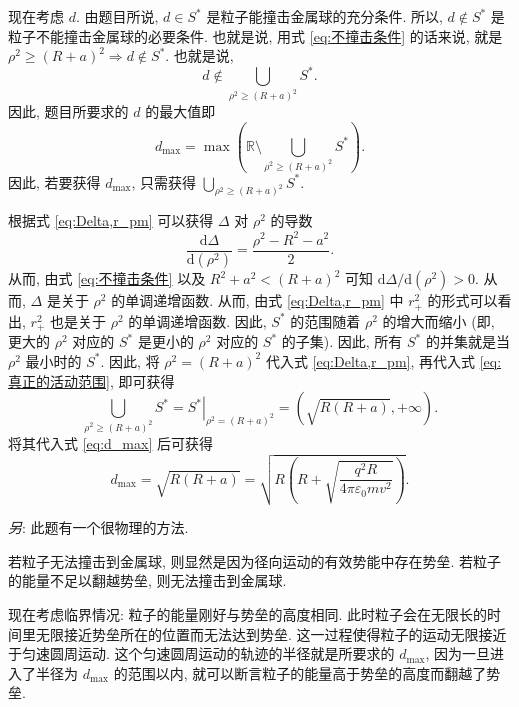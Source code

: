 \documentclass{article}
\begin{document}
现在考虑 $d$.
由题目所说, $d\in S^*$ 是粒子能撞击金属球的充分条件.
所以, $d\notin S^*$ 是粒子不能撞击金属球的必要条件.
也就是说, 用式 \ref{eq:不撞击条件} 的话来说, 就是
$\rho^2\ge\left(R+a\right)^2\Rightarrow d\notin S^*$.
也就是说,
\begin{equation}
	d\notin\bigcup_{\rho^2\ge\left(R+a\right)^2}S^*.
\end{equation}
因此, 题目所要求的 $d$ 的最大值即
\begin{equation}
	\label{eq:d_max}
	d_{\mathrm{max}}=\max\left(\mathbb R\setminus
	\bigcup_{\rho^2\ge\left(R+a\right)^2}S^*\right).
\end{equation}
因此, 若要获得 $d_{\mathrm{max}}$, 只需获得 $\bigcup_{\rho^2\ge\left(R+a\right)^2}S^*$.

根据式 \ref{eq:Delta,r_pm} 可以获得 $\Delta$ 对 $\rho^2$ 的导数
\begin{equation}
	\frac{\mathrm d\Delta}{\mathrm d\!\left(\rho^2\right)}=\frac{\rho^2-R^2-a^2}2.
\end{equation}
从而, 由式 \ref{eq:不撞击条件} 以及 $R^2+a^2<\left(R+a\right)^2$ 可知
$\mathrm d\Delta/\mathrm d\!\left(\rho^2\right)>0$.
从而, $\Delta$ 是关于 $\rho^2$ 的单调递增函数.
从而, 由式 \ref{eq:Delta,r_pm} 中 $r_+^2$ 的形式可以看出,
$r_+^2$ 也是关于 $\rho^2$ 的单调递增函数.
因此, $S^*$ 的范围随着 $\rho^2$ 的增大而缩小
(即, 更大的 $\rho^2$ 对应的 $S^*$ 是更小的 $\rho^2$ 对应的 $S^*$ 的子集).
因此, 所有 $S^*$ 的并集就是当 $\rho^2$ 最小时的 $S^*$.
因此, 将 $\rho^2=\left(R+a\right)^2$ 代入式 \ref{eq:Delta,r_pm},
再代入式 \ref{eq:真正的活动范围}, 即可获得
\begin{equation}
	\bigcup_{\rho^2\ge\left(R+a\right)^2}S^*=
	\left.S^*\right|_{\rho^2=\left(R+a\right)^2}=
	\left(\sqrt{R\left(R+a\right)},+\infty\right).
\end{equation}
将其代入式 \ref{eq:d_max} 后可获得
\begin{equation}
	\label{eq:d_max答案}
	d_{\mathrm{max}}=\sqrt{R\left(R+a\right)}=
	\sqrt{R\left(R+\sqrt{\frac{q^2R}{4\pi\varepsilon_0mv^2}}\right)}.
\end{equation}

\textit{另}: 此题有一个很物理的方法.

若粒子无法撞击到金属球, 则显然是因为径向运动的有效势能中存在势垒.
若粒子的能量不足以翻越势垒, 则无法撞击到金属球.

现在考虑临界情况: 粒子的能量刚好与势垒的高度相同.
此时粒子会在无限长的时间里无限接近势垒所在的位置而无法达到势垒.
这一过程使得粒子的运动无限接近于匀速圆周运动.
这个匀速圆周运动的轨迹的半径就是所要求的 $d_{\mathrm{max}}$,
因为一旦进入了半径为 $d_{\mathrm{max}}$ 的范围以内,
就可以断言粒子的能量高于势垒的高度而翻越了势垒.
\end{document}
